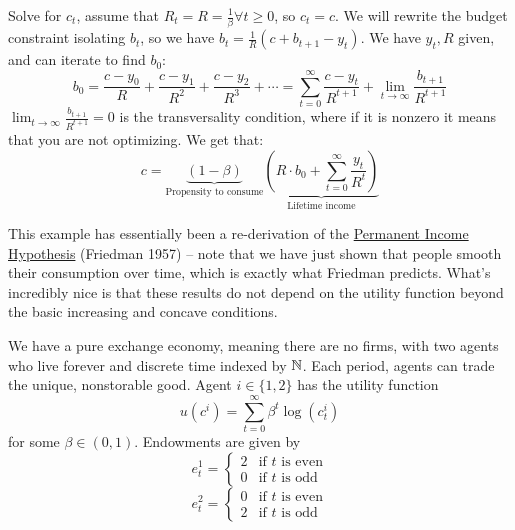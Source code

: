 \documentclass[10pt]{article}
\begin{document}
\begin{example}
	Solve for $c_t$, assume that $R_t = R = \frac{1}{\beta} \forall t \ge 0$, so $c_t = c$. We will rewrite the budget constraint isolating $b_t$, so we have $b_t = \frac{1}{R}(c + b_{t+1} - y_t)$. We have $y_t, R$ given, and can iterate to find $b_0$:
	\[
	b_0 = \frac{c-y_0}{R	} + \frac{c-y_1}{R^2} + \frac{c - y_2}{R^3} + \cdots = \sum_{t=0}^\infty \frac{c - y_t}{R^{t+1}} + \lim_{t\to\infty} \frac{b_{t+1}}{R^{t+1}}
	\]
	$\lim_{t\to\infty} \frac{b_{t+1}}{R^{t+1}} = 0$ is the transversality condition, where if it is nonzero it means that you are not optimizing. We get that:
	\[
	c = \underbrace{(1-\beta)}_{\text{Propensity to consume}} \underbrace{\left(R \cdot b_0 + \sum_{t=0}^\infty \frac{y_t}{R^t} \right)}_{\text{Lifetime income}}
	\]
\end{example}

This example has essentially been a re-derivation of the \href{https://www.nber.org/system/files/chapters/c4405/c4405.pdf}{Permanent Income Hypothesis} (Friedman 1957) -- note that we have just shown that people smooth their consumption over time, which is exactly what Friedman predicts. What's incredibly nice is that these results do not depend on the utility function beyond the basic increasing and concave conditions.
\medskip

\begin{model}
	 We have a pure exchange economy, meaning there are no firms, with two agents who live forever and discrete time indexed by $\mathbb{N}$. Each period, agents can trade the unique, nonstorable good. Agent $i \in \{1,2\}$ has the utility function
	\[
	u(c^i) = \sum_{t=0}^\infty \beta^t \log(c_t^i)
	\]
	for some $\beta \in (0,1)$. Endowments are given by
	\[
	e_t^1 = \begin{cases} 2 & \text{if $t$ is even} \\
	0 & \text{if $t$ is odd} \end{cases}
	\]
	\[
	e_t^2 = \begin{cases} 0 & \text{if $t$ is even} \\
	2 & \text{if $t$ is odd} \end{cases}
	\]
\end{model}
\end{document}
